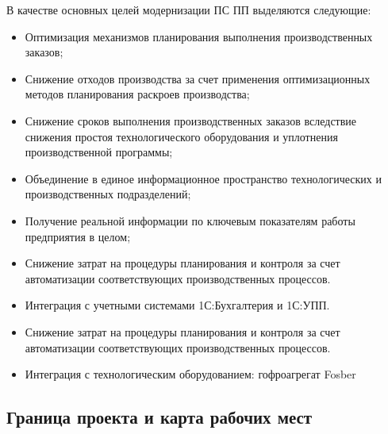 В качестве основных целей модернизации ПС ПП выделяются следующие:
\begin{itemize}
    \item Оптимизация механизмов планирования выполнения производственных заказов;
    \item Снижение отходов производства за счет применения оптимизационных методов планирования раскроев производства;
    \item Снижение сроков выполнения производственных заказов вследствие снижения простоя технологического оборудования и уплотнения производственной программы;
    \item Объединение в единое информационное пространство технологических и производственных подразделений;
    \item Получение реальной информации по ключевым показателям работы предприятия в целом;
    \item Снижение затрат на процедуры планирования и контроля за счет автоматизации соответствующих производственных процессов.
    \item Интеграция с учетными системами 1С:Бухгалтерия и 1С:УПП.
    \item Снижение затрат на процедуры планирования и контроля за счет автоматизации соответствующих производственных процессов.
     \item Интеграция с технологическим оборудованием: гофроагрегат Fosber
\end{itemize}





\subsection{Граница проекта и карта рабочих мест}

